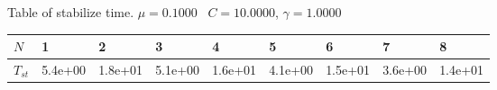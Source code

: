 \begin{center}
Table of stabilize time. $\mu = 0.1000$ \, $C = 10.0000$, $\gamma = 1.0000$
  
\begin{tabular}{|p{0.6in}|p{0.6in}|p{0.6in}|p{0.6in}|p{0.6in}|p{0.6in}|p{0.6in}|p{0.6in}|p{0.6in}|} \hline
$N$ &1 &2 &3 &4 &5 &6 &7 &8 \\ \hline 
$T_{st}$ &5.4e+00 &1.8e+01 &5.1e+00 &1.6e+01 &4.1e+00 &1.5e+01 &3.6e+00 &1.4e+01 \\ \hline 

\end{tabular}\\[20pt]
\end{center}
